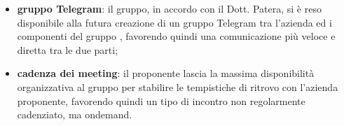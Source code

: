 \begin{enumerate}
	\begin{itemize}
		\item \textbf{gruppo Telegram}: il gruppo, in accordo con il Dott. Patera, si è reso disponibile alla futura creazione di un gruppo Telegram tra l'azienda ed i componenti del gruppo \Gruppo{}, favorendo quindi una comunicazione più veloce e diretta tra le due parti;
		\item \textbf{cadenza dei meeting}: il proponente lascia la massima disponibilità organizzativa al gruppo \Gruppo{} per stabilire le tempistiche di ritrovo con l'azienda proponente, favorendo quindi un tipo di incontro non regolarmente cadenziato, ma ondemand.
	\end{itemize}
\end{enumerate}